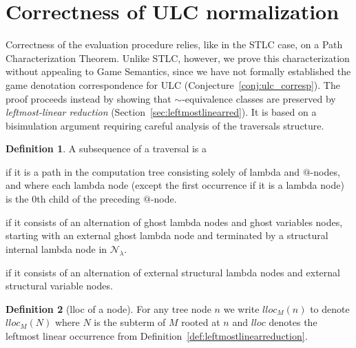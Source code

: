 \documentclass{elsarticle}
\makeatletter
\theoremstyle{plain}
\theoremstyle{definition}
\newtheorem{definition}{Definition}[section]
\theoremstyle{remark}
\newcommand\Nodes{\mathcal{N}}%
\newcommand\NodesLmd{\Nodes_\lambda}%
\renewcommand\ie{{\it i.e.\@\xspace}}
\makeatother
\begin{document}
\section{Correctness of ULC normalization}
\label{sec:correctness_ulc_normalization}
Correctness of the evaluation procedure relies, like in the STLC case, on a Path Characterization Theorem.
Unlike STLC, however, we prove this characterization without appealing to Game Semantics, since we have not formally established the game denotation correspondence for ULC (Conjecture~\ref{conj:ulc_corresp}). The proof proceeds instead by showing that $\sim$-equivalence classes are preserved by \emph{leftmost-linear reduction} (Section~\ref{sec:leftmostlinearred}). It is based on a bisimulation argument requiring careful analysis of the traversals structure.


\begin{definition}
    \label{def:spinaldescent_pendingarglookup}
A subsequence of a traversal is a
\begin{enumerate*}[nosep,label=(\roman*)]
\item {} if it is a path in the computation tree consisting solely of lambda and $@$-nodes, and where each lambda node (except the first occurrence if it is a lambda node) is the $0$th child of the preceding $@$-node.
\item {} if it consists of an alternation of ghost lambda nodes and ghost variables nodes, starting with an external ghost lambda node and terminated by a structural internal lambda node in $\NodesLmd$.
\item {} if it consists of an alternation of external structural lambda nodes and external structural variable nodes.
\end{enumerate*}
\end{definition}

\begin{definition}[lloc of a node]
For any tree node $n$ we write $lloc_M(n)$ to denote $lloc_M(N)$ where $N$ is the subterm of $M$ rooted at $n$ and $lloc$ denotes the leftmost linear occurrence from Definition~\ref{def:leftmostlinearreduction}.
\end{definition}
\end{document}
